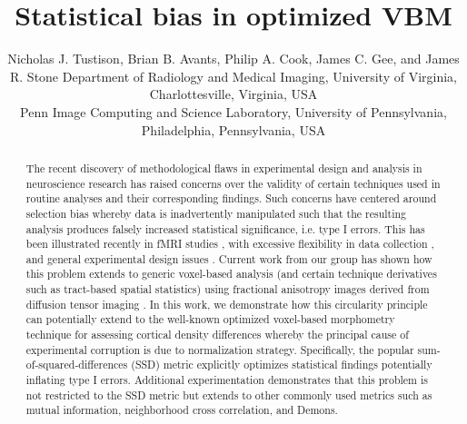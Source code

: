 \documentclass[]{spie}  %
\title{Statistical bias in optimized VBM}
\author{Nicholas J. Tustison\supit{a}, Brian B. Avants\supit{b}, Philip A. Cook\supit{b}, James C. Gee\supit{b}, and James R. Stone\supit{a}
\skiplinehalf
\supit{a}Department of Radiology and Medical Imaging, University of Virginia, Charlottesville, Virginia, USA\\
\supit{b}Penn Image Computing and Science Laboratory, University of Pennsylvania, Philadelphia, Pennsylvania, USA
}
\begin{document}
 
  \maketitle 

\begin{abstract}
The recent discovery of methodological flaws in experimental 
design and analysis in neuroscience research has raised concerns 
over the validity of certain 
techniques used in routine analyses and their corresponding 
findings. 
Such concerns have centered around selection bias whereby data is
inadvertently manipulated such that the resulting analysis produces falsely 
increased statistical significance, i.e. type I errors. This has been 
illustrated recently in fMRI studies \cite{vul2009}, with excessive flexibility 
in data collection \cite{simmons2011}, and general experimental design 
issues \cite{kriegeskorte2009}.  Current work from our group has shown
how this problem extends to generic voxel-based analysis (and certain 
technique derivatives such as tract-based spatial statistics\cite{Smith2006}) 
using fractional anisotropy images derived from diffusion tensor imaging \cite{tustison2012}.
In this work, we demonstrate how this circularity principle 
can potentially extend to the well-known
optimized voxel-based morphometry technique \cite{Good2001} for assessing
cortical density differences whereby the principal cause of experimental 
corruption is due to normalization strategy.  Specifically, the popular sum-of-squared-differences (SSD) metric
explicitly optimizes statistical findings potentially inflating type I errors.  
Additional experimentation demonstrates that 
this problem is not restricted to the SSD metric but extends to other commonly
used metrics such as mutual information, neighborhood cross correlation, and
Demons. 
\end{abstract}

\end{document}

